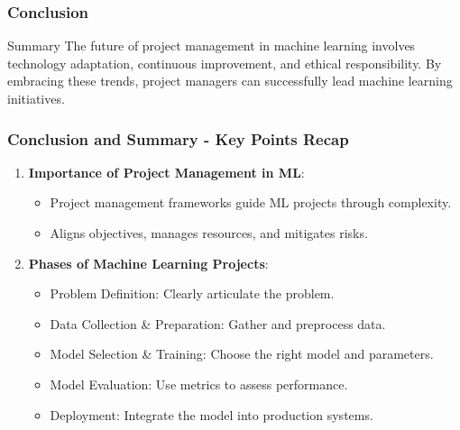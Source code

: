 \documentclass[aspectratio=169]{beamer}
\begin{document}
\begin{frame}[fragile]
    \frametitle{Conclusion}
    \begin{block}{Summary}
        The future of project management in machine learning involves technology adaptation, continuous improvement, and ethical responsibility. By embracing these trends, project managers can successfully lead machine learning initiatives.
    \end{block}
\end{frame}

\begin{frame}[fragile]
    \frametitle{Conclusion and Summary - Key Points Recap}
    \begin{enumerate}
        \item \textbf{Importance of Project Management in ML}:
        \begin{itemize}
            \item Project management frameworks guide ML projects through complexity.
            \item Aligns objectives, manages resources, and mitigates risks.
        \end{itemize}

        \item \textbf{Phases of Machine Learning Projects}:
        \begin{itemize}
            \item Problem Definition: Clearly articulate the problem.
            \item Data Collection \& Preparation: Gather and preprocess data.
            \item Model Selection \& Training: Choose the right model and parameters.
            \item Model Evaluation: Use metrics to assess performance.
            \item Deployment: Integrate the model into production systems.
        \end{itemize}
    \end{enumerate}
\end{frame}
\end{document}
